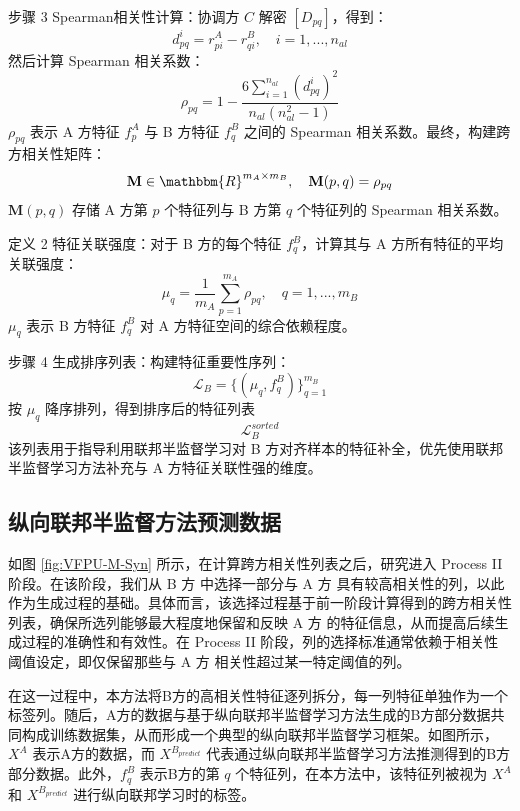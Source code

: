 步骤 3 Spearman相关性计算：协调方 $ C $ 解密 $ [D_{pq}] $，得到：
\begin{equation}
	d_{pq}^i = r^A_{pi} - r^B_{qi}, \quad i = 1, ..., n_{al}
\end{equation}
然后计算 Spearman 相关系数：
\begin{equation}
	\rho_{pq} = 1 - \frac{6\sum_{i=1}^{n_{al}} (d_{pq}^i)^2}{n_{al}(n_{al}^2 - 1)}
\end{equation}
$ \rho_{pq} $ 表示 A 方特征 $ f^A_p $ 与 B 方特征 $ f^B_q $ 之间的 Spearman 相关系数。最终，构建跨方相关性矩阵：
\begin{equation}
	\mathbf{M} \in \mathbbm{R}^{m_A \times m_B}, \quad \mathbf{M}(p,q) = \rho_{pq}
\end{equation}
$ \mathbf{M}(p,q) $ 存储 A 方第 $ p $ 个特征列与 B 方第 $ q $ 个特征列的 Spearman 相关系数。

定义 2 特征关联强度：对于 B 方的每个特征 $ f^B_q $，计算其与 A 方所有特征的平均关联强度：
\begin{equation}
	\mu_q = \frac{1}{m_A} \sum_{p=1}^{m_A} \rho_{pq}, \quad q=1,...,m_B
\end{equation}
$ \mu_q $ 表示 B 方特征 $ f^B_q $ 对 A 方特征空间的综合依赖程度。

步骤 4 生成排序列表：构建特征重要性序列：
\begin{equation}
	\mathcal{L}_B = \{(\mu_q, f^B_q)\}_{q=1}^{m_B}
\end{equation}
按 $ \mu_q $ 降序排列，得到排序后的特征列表
\begin{equation}
	\mathcal{L}_B^{sorted}
\end{equation}
该列表用于指导利用联邦半监督学习对 B 方对齐样本的特征补全，优先使用联邦半监督学习方法补充与 A 方特征关联性强的维度。
\subsection{纵向联邦半监督方法预测数据}
如图 \ref{fig:VFPU-M-Syn} 所示，在计算跨方相关性列表之后，研究进入 Process II 阶段。在该阶段，我们从 B 方 中选择一部分与 A 方 具有较高相关性的列，以此作为生成过程的基础。具体而言，该选择过程基于前一阶段计算得到的跨方相关性列表，确保所选列能够最大程度地保留和反映 A 方 的特征信息，从而提高后续生成过程的准确性和有效性。在 Process II 阶段，列的选择标准通常依赖于相关性阈值设定，即仅保留那些与 A 方 相关性超过某一特定阈值的列。

在这一过程中，本方法将B方的高相关性特征逐列拆分，每一列特征单独作为一个标签列。随后，A方的数据与基于纵向联邦半监督学习方法生成的B方部分数据共同构成训练数据集，从而形成一个典型的纵向联邦半监督学习框架。如图所示，$X^A$ 表示A方的数据，而 ${{X}^{{{B}_{predict}}}}$ 代表通过纵向联邦半监督学习方法推测得到的B方部分数据。此外，$f_{q}^{B}$ 表示B方的第 $q$ 个特征列，在本方法中，该特征列被视为 $X^A$ 和 ${{X}^{{{B}_{predict}}}}$ 进行纵向联邦学习时的标签。

